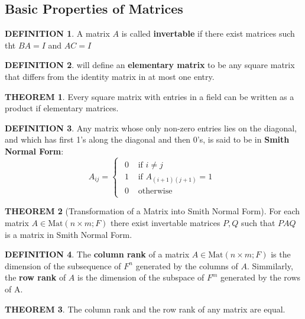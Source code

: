 \documentclass[12pt]{article}
\theoremstyle{definition}
\newtheorem{definition}{DEFINITION}[subsection]
\newtheorem{theorem}{THEOREM}[subsection]
\newcommand{\Mat}{\text{Mat}}
\begin{document}
\subsection{Basic Properties of Matrices}
\begin{definition}
    A matrix $A$ is called \textbf{invertable} if there exist matrices such tht $BA = I$ and $AC = I$
\end{definition}

\begin{definition}
    will define an \textbf{elementary matrix} to be any square matrix that differs from the identity matrix in at most one entry.
\end{definition}

\begin{theorem}
    Every square matrix with entries in a field can be written as a product if elementary matrices.
\end{theorem}

\begin{definition}
    Any matrix whose only non-zero entries lies on the diagonal, and which has first 1's along the diagonal and then 0's, is said to be in \textbf{Smith Normal Form}:
    \[A_{ij} = \begin{cases}\begin{split}
        0 &\text{ if } i \neq j\\
        1 &\text{ if } A_{(i+1)(j+1)} = 1\\
        0 &\text{ otherwise}
    \end{split}\end{cases}\]
\end{definition}

\begin{theorem}[Transformation of a Matrix into Smith Normal Form]
    For each matrix $A \in \Mat(n\times m;F)$ there exist invertable matrices $P,Q$ such that $PAQ$ is a matrix in Smith Normal Form.
\end{theorem}

\begin{definition}
    The \textbf{column rank} of a matrix $A \in \Mat(n\times m;F)$ is the dimension of the subsequence of $F^n$ generated by the columns of $A$. Simmilarly, the \textbf{row rank} of $A$ is the dimension of the subspace of $F^m$ generated by the rows of A.
\end{definition}

\begin{theorem}
    The column rank and the row rank of any matrix are equal.
\end{theorem}
\end{document}
